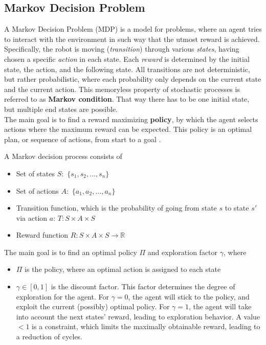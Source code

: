 \documentclass[a4paper]{article}
\begin{document}
	\subsection{Markov Decision Problem}
	A Markov Decision Problem (MDP) is a model for problems, where an agent tries to interact with the environment in such way that the utmost reward is achieved. Specifically, the robot is moving (\textit{transition}) through various \textit{states}, having chosen a specific \textit{action} in each state. Each \textit{reward} is determined by the initial state, the action, and the following state. 
	All transitions are not deterministic, but rather probabilistic, where each probability only depends on the current state and the current action. This memoryless property of stochastic processes is referred to as \textbf{Markov condition}. That way there has to be one initial state, but multiple end states are possible.\\
	The main goal is to find a reward maximizing \textbf{policy}, by which the agent selects actions where the maximum reward can be expected. This policy is an optimal plan, or sequence of actions, from start to a goal \citep{Lecture}.
	\par A Markov decision process consists of
	\begin{itemize}
		\item Set of states $S:$ $\{s_1,s_2,\dots, s_n\}$
		\item Set of actions $A:$  $\{a_1,a_2,\dots, a_n\}$ 
		\item Transition function, which is the probability of going from state $s$ to state $s'$ via action $a$: $T: S\times A \times S$
		\item  Reward function $R: S\times A \times S \rightarrow \mathbb{R}$
	\end{itemize}
	The main goal is to find an optimal policy $\Pi$ and exploration factor $\gamma$, where
	\begin{itemize}
		\item $\Pi$ is the policy, where an optimal action is assigned to each state
		\item $\gamma \in [0,1]$ is the discount factor. This factor determines the degree of exploration for the agent. For $\gamma=0$, the agent will stick to the policy, and exploit the current (possibly) optimal policy. For $\gamma=1$, the agent will take into account the next states' reward, leading to exploration behavior. A value $<1$ is a constraint, which limits the maximally obtainable reward, leading to a reduction of cycles.
	\end{itemize}
\end{document}
